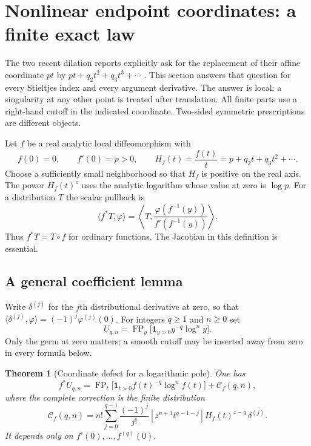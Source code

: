 \documentclass[11pt,a4paper]{article}
\numberwithin{equation}{section}
\newtheorem{theorem}{Theorem}[section]
\theoremstyle{definition}
\theoremstyle{remark}
\DeclareMathOperator{\FP}{FP}
\begin{document}


\section{Nonlinear endpoint coordinates: a finite exact law}
\label{xid:sec:nonlinear}

The two recent dilation reports explicitly ask for the replacement of
their affine coordinate $pt$ by $pt+q_2t^2+q_3t^3+\cdots$
\cite{IncomingMellin,IncomingIdentities}.  This section answers that
question for every Stieltjes index and every argument derivative.  The
answer is local: a singularity at any other point is treated after
translation.  All finite parts use a right-hand cutoff in the indicated
coordinate.  Two-sided symmetric prescriptions are different objects.

Let $f$ be a real analytic local diffeomorphism with
\begin{equation}\label{xid:eq:f-germ}
 f(0)=0,\qquad f'(0)=p>0,\qquad
 H_f(t)=\frac{f(t)}t=p+q_2t+q_3t^2+\cdots.
\end{equation}
Choose a sufficiently small neighborhood so that $H_f$ is positive on
the real axis.  The power $H_f(t)^z$ uses the analytic logarithm whose
value at zero is $\log p$.  For a distribution $T$ the scalar pullback is
\begin{equation}\label{xid:eq:pullback-definition}
 \langle f^*T,\varphi\rangle
 =\left\langle T,
 \frac{\varphi(f^{-1}(y))}{f'(f^{-1}(y))}\right\rangle.
\end{equation}
Thus $f^*T=T\circ f$ for ordinary functions.  The Jacobian in this
definition is essential.

\subsection{A general coefficient lemma}

Write $\delta^{(j)}$ for the $j$th distributional derivative at zero,
so that $\langle\delta^{(j)},\varphi\rangle=(-1)^j\varphi^{(j)}(0)$.
For integers $q\ge1$ and $n\ge0$ set
\[
 U_{q,n}=\FP_y\bigl[\mathbf1_{y>0}y^{-q}\log^n y\bigr].
\]
Only the germ at zero matters; a smooth cutoff may be inserted away
from zero in every formula below.

\begin{theorem}[Coordinate defect for a logarithmic pole]
\label{xid:thm:coordinate-monomial}
One has
\begin{equation}\label{xid:eq:coordinate-monomial}
 f^*U_{q,n}
 =\FP_t\bigl[\mathbf1_{t>0}f(t)^{-q}\log^n f(t)\bigr]
       +\mathcal C_f(q,n),
\end{equation}
where the complete correction is the finite distribution
\begin{equation}\label{xid:eq:C-generator}
 \mathcal C_f(q,n)
 =n!\sum_{j=0}^{q-1}\frac{(-1)^j}{j!}
   [z^{n+1}t^{q-1-j}]H_f(t)^{z-q}\,\delta^{(j)}.
\end{equation}
It depends only on $f'(0),\ldots,f^{(q)}(0)$.
\end{theorem}
\end{document}
